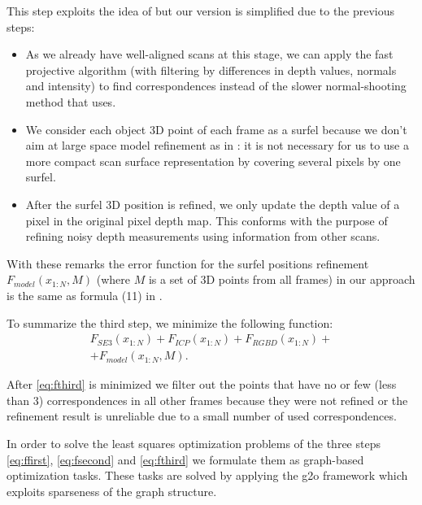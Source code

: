 \documentclass[letterpaper, 10 pt, conference]{ieeeconf}  %
\begin{document}
This step exploits the idea of \cite{ruhnke2012highly} but our version 
is simplified due to the previous steps: 

\begin{itemize}
 \item As we already have well-aligned scans at this stage, we can apply 
 the fast projective algorithm \cite{rusinkiewicz2001efficient} 
 (with filtering by differences in depth values, 
 normals and intensity) to find correspondences instead of the slower
 normal-shooting method that \cite{ruhnke2012highly} uses.
 \item We consider each object 3D point of each frame as 
 a surfel because we don't aim at large space model refinement as in \cite{ruhnke2012highly}:
 it is not necessary for us to use a more compact scan surface representation by covering several pixels 
 by one surfel.
 \item After the surfel 3D position is refined, we only update the depth value 
 of a pixel in the original pixel depth map. This conforms with the purpose of
 refining noisy depth measurements using information from other scans.
\end{itemize}

With these remarks the error function for the surfel positions refinement 
$F_{model}(x_{1:N}, M)$ (where $M$ is a set of 3D points from 
all frames) in our approach is the same as formula (11) in \cite{ruhnke2012highly}.

To summarize the third step, we minimize the following function:
\begin{multline} \label{eq:fthird}
F_{SE3}(x_{1:N}) + F_{ICP}(x_{1:N}) + F_{RGBD}(x_{1:N}) + \\
+ F_{model}(x_{1:N}, M).
\end{multline}

After \eqref{eq:fthird} is minimized we filter out the points 
that have no or few (less than 3) correspondences in
all other frames because they were not refined or the refinement result
is unreliable due to a small number of used correspondences.

In order to solve the least squares optimization problems 
of the three steps \eqref{eq:ffirst}, \eqref{eq:fsecond} and \eqref{eq:fthird} 
we formulate them as graph-based optimization tasks.
These tasks are solved by applying the g2o framework 
\cite{kuemmerle2011g2o} which exploits sparseness of the graph structure.
\end{document}
